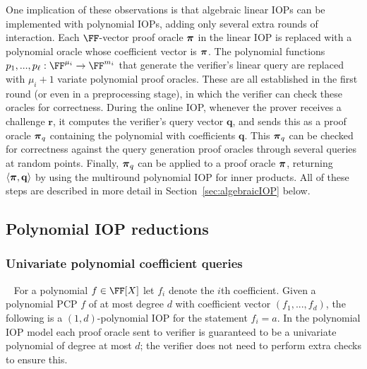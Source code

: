 One implication of these observations is that algebraic linear IOPs can be implemented with polynomial IOPs, adding only several extra rounds of interaction. Each $\FF$-vector proof oracle $\boldsymbol{\pi}$ in the linear IOP is replaced with a polynomial oracle whose coefficient vector is $\boldsymbol{\pi}$. The polynomial functions $p_1,...,p_\ell: \FF^{\mu_i} \rightarrow \FF^{m_i}$ that generate the verifier's linear query are replaced with $\mu_i+1$ variate polynomial proof oracles. These are all established in the first round (or even in a preprocessing stage), in which the verifier can check these oracles for correctness. During the online IOP, whenever the prover receives a challenge $\mathbf{r}$, it computes the verifier's query vector $\mathbf{q}$, and sends this as a proof oracle $\boldsymbol{\pi}_q$ containing the polynomial with coefficients $\mathbf{q}$. This $\boldsymbol{\pi}_q$ can be checked for correctness against the query generation proof oracles through several queries at random points. Finally, $\boldsymbol{\pi}_q$ can be applied to a proof oracle $\boldsymbol{\pi}$, returning $\langle \boldsymbol{\pi}, \mathbf{q} \rangle$ by using the multiround polynomial IOP for inner products. All of these steps are described in more detail in Section~\ref{sec:algebraicIOP} below. 
\fi 


\subsection{Polynomial IOP reductions} 
\subsubsection{Univariate polynomial coefficient queries}~\label{sec:opencoefficient} 
For a polynomial $f \in \FF[X]$ let $f_i$ denote the $i$th coefficient. Given a polynomial PCP $f$ of at most degree $d$ with coefficient vector $(f_1,...,f_d)$, the following is a $(1, d)$-polynomial IOP for the statement $f_i = a$. In the polynomial IOP model each proof oracle sent to verifier is guaranteed to be a univariate polynomial of degree at most $d$; the verifier does not need to perform extra checks to ensure this.

